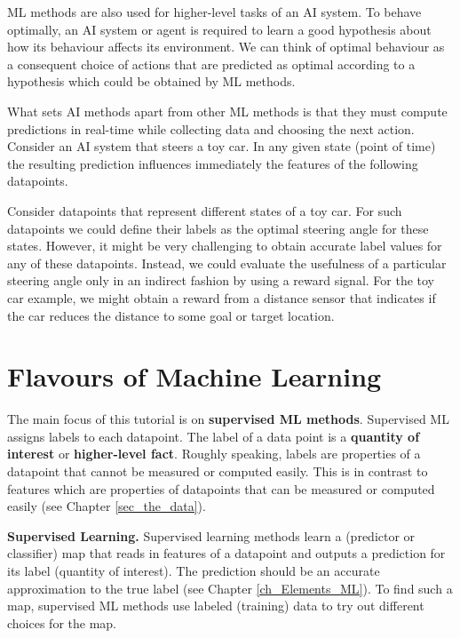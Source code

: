 \documentclass[12pt]{report}
\begin{document}
ML methods are also used for higher-level tasks of an AI system. 
To behave optimally, an AI system or agent is required to learn a 
good hypothesis about how its behaviour affects its environment. 
We can think of optimal behaviour as a consequent choice of actions 
that are predicted as optimal according to a hypothesis which 
could be obtained by ML methods. 


What sets AI methods apart from other ML methods is that they must 
compute predictions in real-time while collecting data and choosing 
the next action. Consider an AI system that steers a toy car. In any 
given state (point of time) the resulting prediction influences immediately 
the features of the following datapoints. 

Consider datapoints that represent different states of a toy car. 
For such datapoints we  could define their labels as the optimal 
steering angle for these states. However, it might be very challenging 
to obtain accurate label values for any of these datapoints. Instead, 
we could evaluate the usefulness of a particular steering angle only 
in an indirect fashion by using a reward signal. For the toy car example, 
we might obtain a reward from a distance sensor that indicates if the 
car reduces the distance to some goal or target location. 


\section{Flavours of Machine Learning} 

The main focus of this tutorial is on {\bf supervised ML methods}. 
Supervised ML assigns labels to each datapoint. The label of a data 
point is a {\bf quantity of interest} or {\bf higher-level fact}. Roughly 
speaking, labels are properties of a datapoint that cannot be 
measured or computed easily. This is in contrast to features which 
are properties of datapoints that can be measured or computed 
easily (see Chapter \ref{sec_the_data}). 

{\bf Supervised Learning.} Supervised learning methods learn 
a (predictor or classifier) map that reads in features of a datapoint 
and outputs a prediction for its label (quantity of interest). The 
prediction should be an accurate approximation to the true label 
(see Chapter \ref{ch_Elements_ML}). To find such a map, supervised 
ML methods use labeled (training) data to try out different choices for 
the map.  
\end{document}
